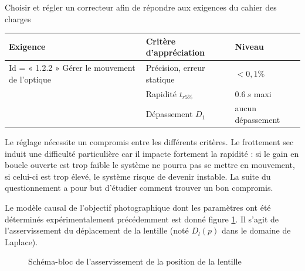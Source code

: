\begin{obj}
Choisir et régler un correcteur afin de répondre aux exigences du cahier des charges
\end{obj}

\begin{center}
\begin{tabular}{|p{}|p{}|p{}|}
\hline 
\textbf{Exigence} & \textbf{Critère d'appréciation} & \textbf{Niveau} \\ 
\hline 
Id = « 1.2.2 » Gérer le mouvement de l'optique & Précision, erreur statique & $<0,1\%$ \\ 
\cline{2-3}
& Rapidité $t_{r5\%}$ & $\SI{0,6}{s}$ maxi \\ 
\cline{2-3}
& Dépassement $D_1$ & aucun dépassement \\ 
\hline 
\end{tabular} 
\end{center}


Le réglage nécessite un compromis
entre les différents critères. Le frottement sec induit une difficulté
particulière car il impacte fortement la rapidité : si le gain en boucle
ouverte est trop faible le système ne pourra pas se mettre en mouvement,
si celui-ci est trop élevé, le système risque de devenir instable. La
suite du questionnement a pour but d'étudier comment trouver un bon
compromis.

Le modèle causal de l'objectif photographique dont les paramètres ont
été déterminés expérimentalement précédemment est donné figure \ref{fig14}. Il s'agit de l'asservissement du déplacement de la lentille (noté $D_l(p)$ dans le domaine de Laplace).

\begin{figure}[!htb]
\begin{center}


\caption{Schéma-bloc de l'asservissement de la position de la lentille \label{fig14}}
\end{center}
\end{figure}



